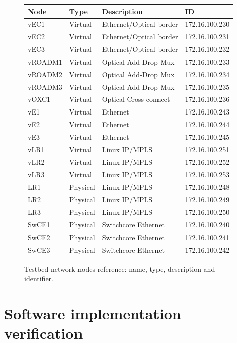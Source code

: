 \documentclass[10pt,a4paper]{report}
\begin{document}
\begin{figure}[!htbp]
  \begin{center}
    \begin{tabular}{|l|l|l|l|}
      \hline
      Node & Type & Description & ID \\ \hline
      vEC1 & Virtual & Ethernet/Optical border & 172.16.100.230 \\
      vEC2 & Virtual & Ethernet/Optical border & 172.16.100.231 \\
      vEC3 & Virtual & Ethernet/Optical border & 172.16.100.232 \\
      vROADM1 & Virtual & Optical Add-Drop Mux & 172.16.100.233 \\
      vROADM2 & Virtual & Optical Add-Drop Mux & 172.16.100.234 \\
      vROADM3 & Virtual & Optical Add-Drop Mux & 172.16.100.235 \\
      vOXC1 & Virtual & Optical Cross-connect & 172.16.100.236 \\
      vE1 & Virtual & Ethernet & 172.16.100.243 \\
      vE2 & Virtual & Ethernet & 172.16.100.244 \\
      vE3 & Virtual & Ethernet & 172.16.100.245 \\
      vLR1 & Virtual & Linux IP/MPLS & 172.16.100.251 \\
      vLR2 & Virtual & Linux IP/MPLS & 172.16.100.252 \\
      vLR3 & Virtual & Linux IP/MPLS & 172.16.100.253 \\
      LR1 & Physical & Linux IP/MPLS & 172.16.100.248 \\
      LR2 & Physical & Linux IP/MPLS & 172.16.100.249 \\
      LR3 & Physical & Linux IP/MPLS & 172.16.100.250 \\
      SwCE1 & Physical & Switchcore Ethernet & 172.16.100.240 \\
      SwCE2 & Physical & Switchcore Ethernet & 172.16.100.241 \\
      SwCE3 & Physical & Switchcore Ethernet & 172.16.100.242 \\
      \hline
    \end{tabular}
    \caption[Testbed network nodes]{Testbed network nodes reference:
      name, type, description and identifier.}
    \label{fig:testbed_legend}
  \end{center}
\end{figure}

\section{Software implementation verification}
\end{document}
